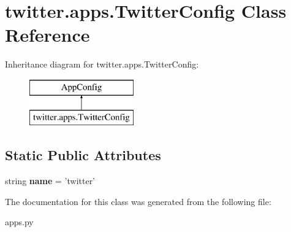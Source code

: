 \hypertarget{classtwitter_1_1apps_1_1TwitterConfig}{\section{twitter.\-apps.\-Twitter\-Config Class Reference}
\label{classtwitter_1_1apps_1_1TwitterConfig}
}
Inheritance diagram for twitter.\-apps.\-Twitter\-Config\-:\begin{figure}[H]
\begin{center}
\leavevmode
\includegraphics[height=2.000000cm]{classtwitter_1_1apps_1_1TwitterConfig}
\end{center}
\end{figure}
\subsection*{Static Public Attributes}
\begin{DoxyCompactItemize}
\item 
\hypertarget{classtwitter_1_1apps_1_1TwitterConfig_ad6fa8da3b1d7a28a13a3a1430d9ad93f}{string {\bfseries name} = 'twitter'}\label{classtwitter_1_1apps_1_1TwitterConfig_ad6fa8da3b1d7a28a13a3a1430d9ad93f}

\end{DoxyCompactItemize}


The documentation for this class was generated from the following file\-:\begin{DoxyCompactItemize}
\item 
apps.\-py\end{DoxyCompactItemize}
